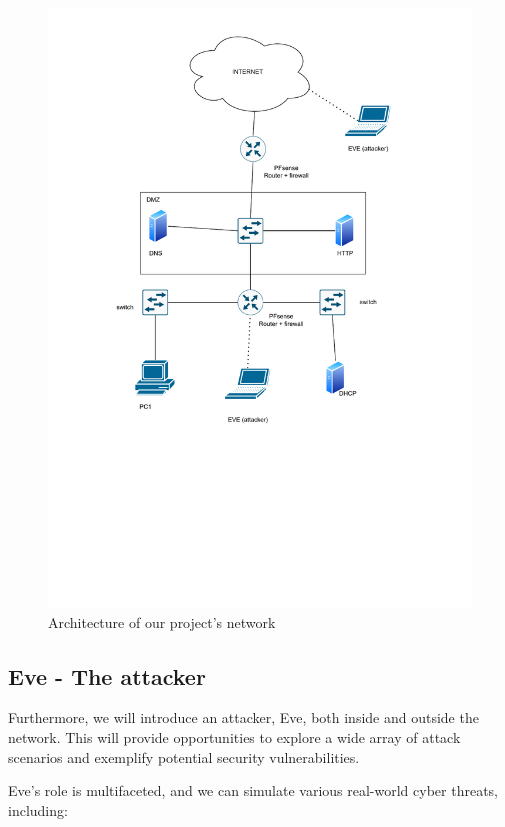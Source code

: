 \documentclass[a4paper,10pt]{article}
\begin{document}
\begin{figure}[bp!]
    \centering
    \includegraphics[scale=0.89]{images/architecture_sketch.pdf}
    \caption{Architecture of our project's network}
    \label{fig:1}
\end{figure}

\newpage

\subsection{Eve - The attacker}
Furthermore, we will introduce an attacker, Eve, both inside and outside the network. This will provide opportunities to explore a wide array of attack scenarios and exemplify potential security vulnerabilities.

Eve's role is multifaceted, and we can simulate various real-world cyber threats, including:
\end{document}
